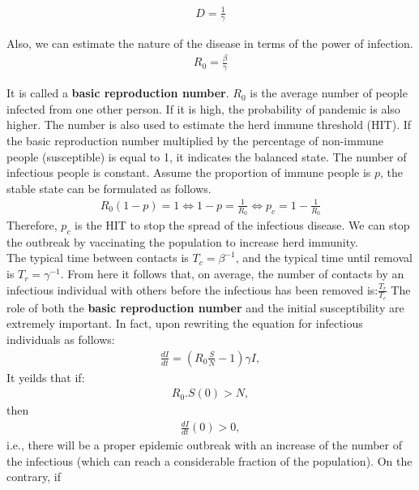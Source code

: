 \documentclass[a4paper]{article}
\begin{document}
    \begin{align}
        D = \frac{1}{\gamma}
    \end{align}    
        
        Also, we can estimate the nature of the disease in terms of the power of infection.
    \begin{align}
        R_0 = \frac{\beta}{\gamma}
    \end{align}    
    
        It is called a \textbf{basic reproduction number}. $R_0$ is the average number of people infected from one other person. If it is high, the probability of pandemic is also higher. The number is also used to estimate the herd immune threshold (HIT). If the basic reproduction number multiplied by the percentage of non-immune people (susceptible) is equal to 1, it indicates the balanced state. The number of infectious people is constant. Assume the proportion of immune people is $p$, the stable state can be formulated as follows.
    \begin{align}
        R_0(1-p) = 1 \Leftrightarrow 1-p=\frac{1}{R_0} \Leftrightarrow p_c = 1 - \frac{1}{R_0}
    \end{align}
        \indent Therefore, $p_c$ is the HIT to stop the spread of the infectious disease. We can stop the outbreak by vaccinating the population to increase herd immunity.\\
        \indent The typical time between contacts is $T_c = \beta^{-1}$, and the typical time until removal is $T_r = \gamma^{-1}$. From here it follows that, on average, the number of contacts by an infectious individual with others before the infectious has been removed is:$\frac{T_r}{T_c}$
        \indent The role of both the \textbf{basic reproduction number} and the initial susceptibility are extremely important. In fact, upon rewriting the equation for infectious individuals as follows:
        \begin{align*}
            \frac{dI}{dt} = (R_0 \frac{S}{N} -1)\gamma I,
        \end{align*}
        It yeilds that if: 
        \begin{align*}
            R_0 . S(0) > N,
        \end{align*}
        then 
        \begin{align*}
            \frac{dI}{dt}(0) > 0,
        \end{align*}
        i.e., there will be a proper epidemic outbreak with an increase of the number of the infectious (which can reach a considerable fraction of the population). On the contrary, if
\end{document}
